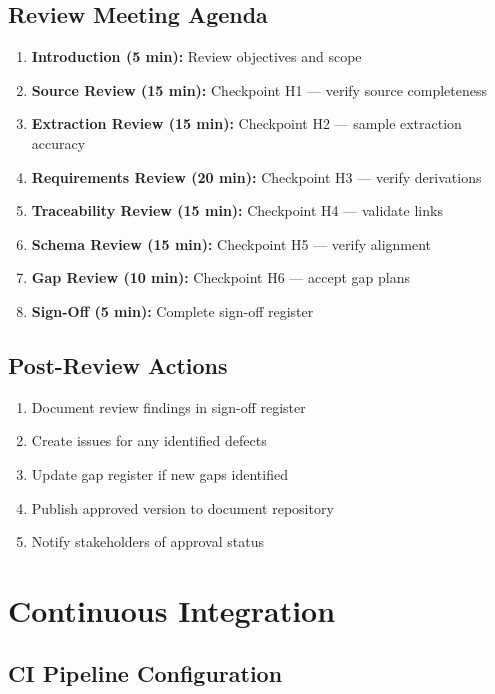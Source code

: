 \subsection{Review Meeting Agenda}

\begin{enumerate}
  \item \textbf{Introduction (5 min):} Review objectives and scope
  \item \textbf{Source Review (15 min):} Checkpoint H1 --- verify source completeness
  \item \textbf{Extraction Review (15 min):} Checkpoint H2 --- sample extraction accuracy
  \item \textbf{Requirements Review (20 min):} Checkpoint H3 --- verify derivations
  \item \textbf{Traceability Review (15 min):} Checkpoint H4 --- validate links
  \item \textbf{Schema Review (15 min):} Checkpoint H5 --- verify alignment
  \item \textbf{Gap Review (10 min):} Checkpoint H6 --- accept gap plans
  \item \textbf{Sign-Off (5 min):} Complete sign-off register
\end{enumerate}

\subsection{Post-Review Actions}

\begin{enumerate}
  \item Document review findings in sign-off register
  \item Create issues for any identified defects
  \item Update gap register if new gaps identified
  \item Publish approved version to document repository
  \item Notify stakeholders of approval status
\end{enumerate}

\section{Continuous Integration}
\label{sec:ci-integration}

\subsection{CI Pipeline Configuration}

